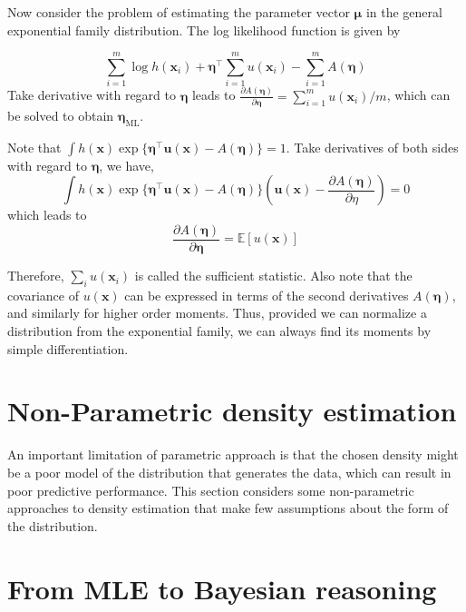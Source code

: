 \documentclass{article}
\begin{document}
\begin{itemize}
	Now consider the problem of estimating the parameter vector $\bm{\mu}$ in the general exponential family distribution. The log likelihood function is given by
	
	\begin{equation*}
	\sum_{i=1}^m \log h(\bm{x}_i) + \bm{\eta}^\top \sum_{i=1}^m u(\bm{x}_i) - \sum_{i=1}^m A(\bm{\eta})
	\end{equation*}
Take derivative with regard to $\bm{\eta}$ leads to $\frac{\partial A(\bm{\eta})}{\partial \bm{\eta}} = \sum_{i=1}^m u(\bm{x}_i)/m$, which can be solved to obtain $\bm{\eta}_\mathrm{ML}$.
	
	Note that $\int  h(\bm{x}) \exp\{ \bm{\eta}^\top \bm{u}(\bm{x}) - A(\bm{\eta}) \} = 1$. Take derivatives of both sides with regard to $\bm{\eta}$, we have,
	\begin{equation*}
	\int  h(\bm{x}) \exp\{ \bm{\eta}^\top \bm{u}(\bm{x}) - A(\bm{\eta}) \} \left(\bm{u}(\bm{x}) - \frac{\partial A(\bm{\eta})}{\partial \eta} \right) = 0
	\end{equation*}
which leads to
	\begin{equation}
	\frac{\partial A(\bm{\eta})}{\partial \bm{\eta}} = \mathbb{E} [u(\bm{x})]
	\end{equation}

	Therefore, $\sum_i u(\bm{x}_i)$ is called the sufficient statistic. Also note that the covariance of $u(\bm{x})$ can be expressed in terms of the second derivatives $A(\bm{\eta})$, and similarly for higher order moments. Thus, provided we can normalize a distribution from the exponential family, we can always find its moments by simple differentiation.
	\end{itemize}
	
\section{Non-Parametric density estimation}

	An important limitation of parametric approach is that the chosen density might be a poor model of the distribution that generates the data, which can result in poor predictive performance. This section  considers some non-parametric approaches to density estimation that make few assumptions about the form of the distribution.
	

\section{From MLE to Bayesian reasoning}
\end{document}
